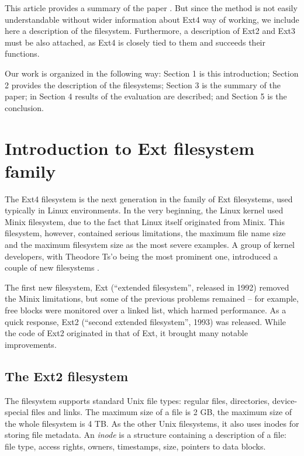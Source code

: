 \documentclass{acm_proc_article-sp}
\begin{document}
This article provides a summary of the paper \cite{afeic}. But since the method is not easily understandable without wider information about Ext4 way of working, we include here a description of the filesystem. Furthermore, a description of Ext2 and Ext3 must be also attached, as Ext4 is closely tied to them and succeeds their functions.

Our work is organized in the following way: Section 1 is this introduction; Section 2 provides the description of the filesystems; Section 3 is the summary of the paper; in Section 4 results of the evaluation are described; and Section 5 is the conclusion.

\section{Introduction to Ext filesystem family}

The Ext4 filesystem is the next generation in the family of Ext filesystems, used typically in Linux environments. In the very beginning, the Linux kernel used Minix filesystem, due to the fact that Linux itself originated from Minix. This filesystem, however, contained serious limitations, the maximum file name size and the maximum filesystem size as the most severe examples. A group of kernel developers, with Theodore Ts'o being the most prominent one, introduced a couple of new filesystems \cite{ext2design}.

The first new filesystem, Ext (``extended filesystem'', released in 1992) removed the Minix limitations, but some of the previous problems remained -- for example, free blocks were monitored over a linked list, which harmed performance. As a quick response, Ext2 (``second extended filesystem'', 1993) was released. While the code of Ext2 originated in that of Ext, it brought many notable improvements.

\subsection{The Ext2 filesystem}

The filesystem supports standard Unix file types: regular files, directories, device-special files and links. The maximum size of a file is 2 GB, the maximum size of the whole filesystem is 4 TB.
As the other Unix filesystems, it also uses inodes for storing file metadata. An {\it inode} is a structure containing a description of a file: file type, access rights, owners, timestamps, size, pointers to data blocks.
\end{document}

